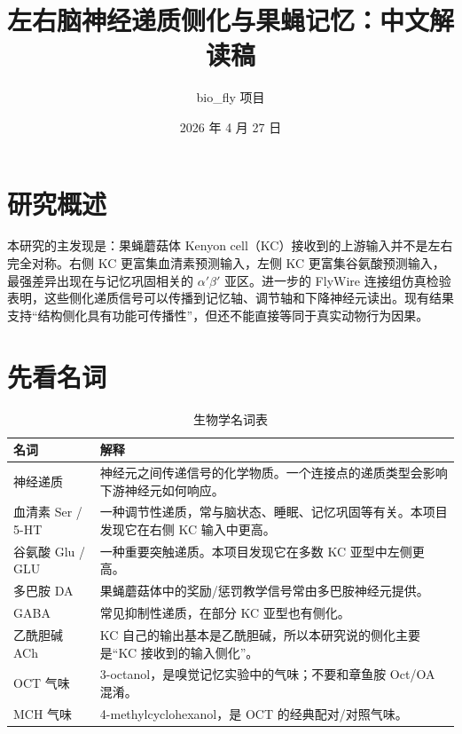 \documentclass[11pt,fontset=none]{ctexart}
\title{\textbf{左右脑神经递质侧化与果蝇记忆：中文解读稿}}
\author{bio\_fly 项目}
\date{2026 年 4 月 27 日}
\begin{document}
\maketitle

\section*{研究概述}

本研究的主发现是：果蝇蘑菇体 Kenyon cell（KC）接收到的上游输入并不是左右完全对称。右侧 KC 更富集血清素预测输入，左侧 KC 更富集谷氨酸预测输入，最强差异出现在与记忆巩固相关的 $\alpha'\beta'$ 亚区。进一步的 FlyWire 连接组仿真检验表明，这些侧化递质信号可以传播到记忆轴、调节轴和下降神经元读出。现有结果支持“结构侧化具有功能可传播性”，但还不能直接等同于真实动物行为因果。

\section*{先看名词}

\begin{table}[H]
\centering\small
\caption{生物学名词表}
\begin{tabularx}{\linewidth}{@{}p{2.8cm}X@{}}
\toprule
\textbf{名词} & \textbf{解释} \\
\midrule
神经递质 & 神经元之间传递信号的化学物质。一个连接点的递质类型会影响下游神经元如何响应。\\
血清素 Ser / 5-HT & 一种调节性递质，常与脑状态、睡眠、记忆巩固等有关。本项目发现它在右侧 KC 输入中更高。\\
谷氨酸 Glu / GLU & 一种重要突触递质。本项目发现它在多数 KC 亚型中左侧更高。\\
多巴胺 DA & 果蝇蘑菇体中的奖励/惩罚教学信号常由多巴胺神经元提供。\\
GABA & 常见抑制性递质，在部分 KC 亚型也有侧化。\\
乙酰胆碱 ACh & KC 自己的输出基本是乙酰胆碱，所以本研究说的侧化主要是“KC 接收到的输入侧化”。\\
OCT 气味 & 3-octanol，是嗅觉记忆实验中的气味；不要和章鱼胺 Oct/OA 混淆。\\
MCH 气味 & 4-methylcyclohexanol，是 OCT 的经典配对/对照气味。\\
\bottomrule
\end{tabularx}
\end{table}
\end{document}
